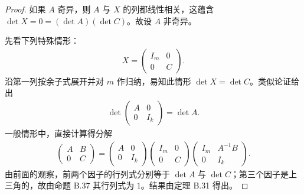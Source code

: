 \documentclass[../../main.tex]{subfiles}
\begin{document}
\begin{proof}
如果 $A$ 奇异，则 $A$ 与 $X$ 的列都线性相关，这蕴含 $\det X=0=(\det A)(\det C)$。故设 $A$ 非奇异。

先看下列特殊情形：
\begin{align*}
X=\begin{pmatrix}I_m&0\\ 0&C\end{pmatrix}.
\end{align*}
沿第一列按余子式展开并对 $m$ 作归纳，易知此情形 $\det X=\det C$。类似论证给出
\begin{align*}
\det\begin{pmatrix}A&0\\ 0&I_k\end{pmatrix}=\det A.
\end{align*}
一般情形中，直接计算得分解
\begin{align}\label{align:appB-block-factorization}
\begin{pmatrix}A&B\\ 0&C\end{pmatrix}
=\begin{pmatrix}A&0\\ 0&I_k\end{pmatrix}
\begin{pmatrix}I_m&0\\ 0&C\end{pmatrix}
\begin{pmatrix}I_m&A^{-1}B\\ 0&I_k\end{pmatrix}.
\end{align}
由前面的观察，前两个因子的行列式分别等于 $\det A$ 与 $\det C$；第三个因子是上三角的，故由命题 B.37 其行列式为 $1$。结果由定理 B.31 得出。
\end{proof}
\end{document}
